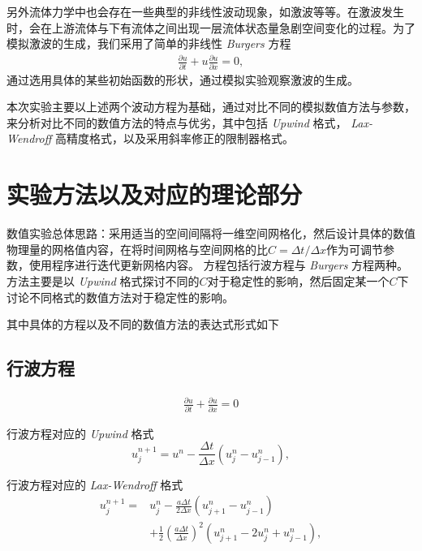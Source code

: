 \documentclass[10.5pt
]{article}
\begin{document}
另外流体力学中也会存在一些典型的非线性波动现象，如激波等等。在激波发生时，会在上游流体与下有流体之间出现一层流体状态量急剧空间变化的过程。为了模拟激波的生成，我们采用了简单的非线性 \textit{Burgers} 方程
\begin{align}
\frac{\partial u}{\partial t} + u \frac{\partial u}{\partial x} = 0, \label{EqnBurgers}
\end{align}
通过选用具体的某些初始函数的形状，通过模拟实验观察激波的生成。

本次实验主要以上述两个波动方程为基础，通过对比不同的模拟数值方法与参数，来分析对比不同的数值方法的特点与优劣，其中包括 \textit{Upwind} 格式， \textit{Lax-Wendroff} 高精度格式，以及采用斜率修正的限制器格式。

\section{实验方法以及对应的理论部分}
数值实验总体思路：采用适当的空间间隔将一维空间网格化，然后设计具体的数值物理量的网格值内容，在将时间网格与空间网格的比$C = \Delta t / \Delta x$作为可调节参数，使用程序进行迭代更新网格内容。
方程包括行波方程与 \textit{Burgers} 方程两种。方法主要是以 \textit{Upwind} 格式探讨不同的$C$对于稳定性的影响，然后固定某一个$C$下讨论不同格式的数值方法对于稳定性的影响。

其中具体的方程以及不同的数值方法的表达式形式如下

\subsection{行波方程}
\begin{align}
\frac{\partial u}{\partial t} + \frac{\partial u}{\partial x} = 0
\end{align}

行波方程对应的 \textit{Upwind} 格式\cite{he_volume-preserving_2015}
\begin{equation}
u_j^{n+1} = u^n - \frac{\Delta t}{\Delta x} (u_j^n - u_{j-1}^n), \label{EqnUpwind}
\end{equation}

行波方程对应的 \textit{Lax-Wendroff} 格式
\begin{align}
	u_j^{n+1} 
	=&
	u_j^{n} 
	-
	\frac{a \Delta t}{ 2 \Delta x } (  	u_{j+1}^{n} - u_{j-1}^{n} ) \\
	&+ \frac{1}{2} \left( \frac{a \Delta t}{ \Delta x } \right)^2 (  	u_{j+1}^{n}- 2 u_j^n + u_{j-1}^{n} ),
\end{align}
\end{document}
